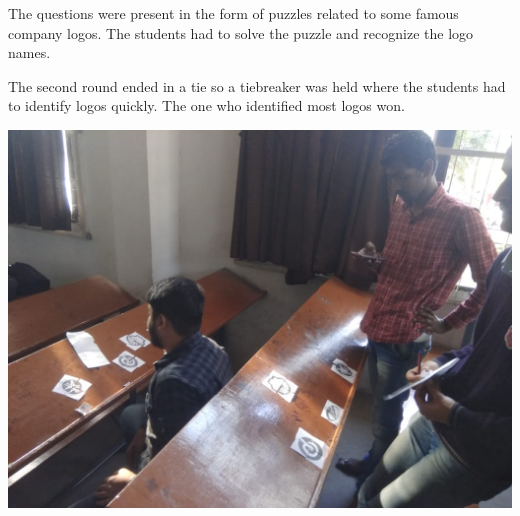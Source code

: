 \documentclass[12pt, a4 paper]{article}
\begin{document}
\begin{center}
\begin{Large}
\begin{multicols}{2}
\columnbreak
{} The questions were present in the form of puzzles related to some famous company logos. The students had to solve the puzzle and recognize the logo names.
\end{multicols} 

\bigskip

\begin{multicols}{2}
 The second round ended in a tie so a tiebreaker was held where the students had to identify logos quickly. The one who identified most logos won.

\columnbreak
\includegraphics[width=\linewidth]{image7.jpg}
  
\end{multicols} 
  
\end{Large} 
\end{center}

\newpage 
\end{document}
